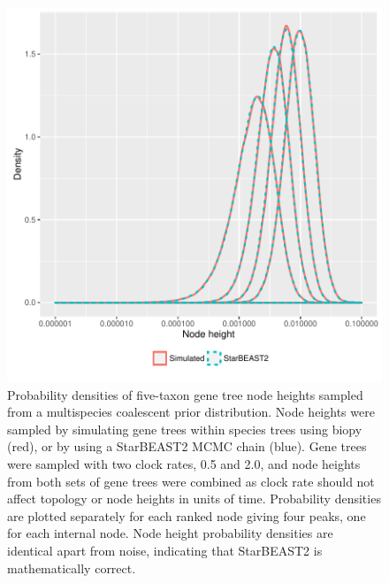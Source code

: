 \documentclass[12pt]{article}
\begin{document}
\begin{figure}[htb!]
\centering
\includegraphics[width=16cm]{gene_node_heights.pdf}
\caption
{Probability densities of five-taxon gene tree node heights sampled from a
multispecies coalescent prior distribution. Node heights were sampled by
simulating gene trees within species trees using biopy (red), or by using a
StarBEAST2 MCMC chain (blue). Gene trees were sampled with two clock rates, 0.5
and 2.0, and node heights from both sets of gene trees were combined as clock
rate should not affect topology or node heights in units of time. Probability
densities are plotted separately for each ranked node giving four peaks, one for
each internal node. Node height probability densities are identical apart from
noise, indicating that StarBEAST2 is mathematically correct.}
\label{fig:geneNodeHeights}
\end{figure}

\clearpage
\end{document}
